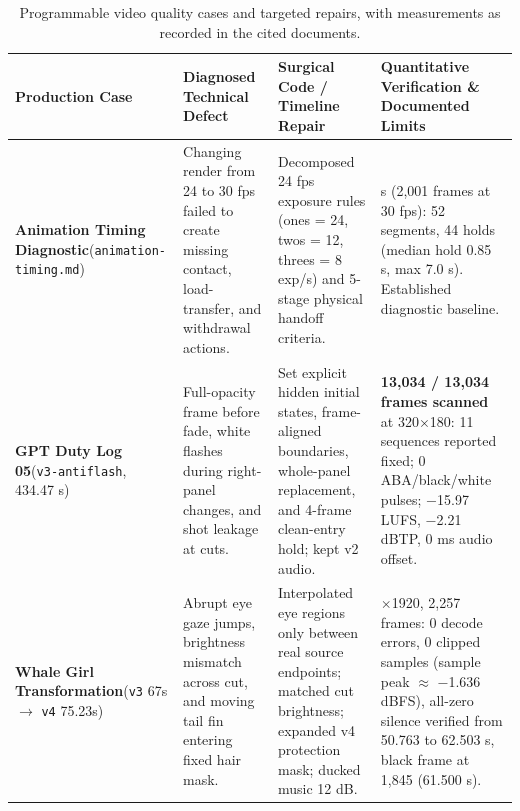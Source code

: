 \documentclass[11pt,a4paper]{article}
\theoremstyle{definition}
\begin{document}
\begin{table}[htbp]
\centering
\caption{Programmable video quality cases and targeted repairs, with measurements as recorded in the cited documents.}
\label{tab:8}
\scriptsize
\setlength{\tabcolsep}{3pt}
\begin{tabular}{>{\raggedright\hspace{0pt}\arraybackslash}p{}>{\raggedright\hspace{0pt}\arraybackslash}p{}>{\raggedright\hspace{0pt}\arraybackslash}p{}>{\raggedright\hspace{0pt}\arraybackslash}p{}}
\toprule
\textbf{Production Case} & \textbf{Diagnosed Technical Defect} & \textbf{Surgical Code / Timeline Repair} & \textbf{Quantitative Verification \& Documented Limits} \\
\midrule
\textbf{Animation Timing Diagnostic}\newline (\texttt{animation-\allowbreak{}timing.\allowbreak{}md}) & Changing render from 24 to 30 fps failed to create missing contact, load-transfer, and withdrawal actions. & Decomposed 24 fps exposure rules (ones = 24, twos = 12, threes = 8 exp/s) and 5-stage physical handoff criteria. & 66.7 s (2,001 frames at 30 fps): 52 segments, 44 holds (median hold 0.85 s, max 7.0 s). Established diagnostic baseline. \\
\textbf{GPT Duty Log 05}\newline (\texttt{v3-antiflash}, 434.47 s) & Full-opacity frame before fade, white flashes during right-panel changes, and shot leakage at cuts. & Set explicit hidden initial states, frame-aligned boundaries, whole-panel replacement, and 4-frame clean-entry hold; kept v2 audio. & \textbf{13,034 / 13,034 frames scanned} at 320$\times$180: 11 sequences reported fixed; 0 ABA/black/white pulses; $-$15.97 LUFS, $-$2.21 dBTP, 0 ms audio offset. \\
\textbf{Whale Girl Transformation}\newline (\texttt{v3} 67s $\rightarrow$ \texttt{v4} 75.23s) & Abrupt eye gaze jumps, brightness mismatch across cut, and moving tail fin entering fixed hair mask. & Interpolated eye regions only between real source endpoints; matched cut brightness; expanded v4 protection mask; ducked music 12 dB. & 1080$\times$1920, 2,257 frames: 0 decode errors, 0 clipped samples (sample peak $\approx$ $-$1.636 dBFS), all-zero silence verified from 50.763 to 62.503 s, black frame at 1,845 (61.500 s). \\

\end{tabular}
\end{table}
\end{document}
